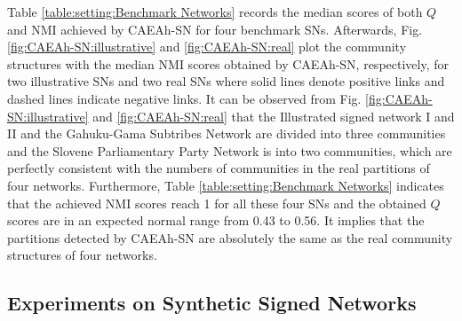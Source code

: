 \documentclass[10pt, journal]{IEEEtran}
\begin{document}
Table \ref{table:setting:Benchmark Networks} records the median scores of both $Q$ and NMI achieved by CAEAh-SN for four benchmark SNs.
Afterwards, Fig. \ref{fig:CAEAh-SN:illustrative} and \ref{fig:CAEAh-SN:real} plot the community structures with the median NMI scores obtained by CAEAh-SN, respectively, for two illustrative SNs and two real SNs where solid lines denote positive links and dashed lines indicate negative links.
It can be observed from Fig. \ref{fig:CAEAh-SN:illustrative} and \ref{fig:CAEAh-SN:real} that the Illustrated signed network I and II and the Gahuku-Gama Subtribes Network are divided into three communities and the Slovene Parliamentary Party Network is into two communities, which are perfectly consistent with the numbers of communities in the real partitions of four networks.
Furthermore, Table \ref{table:setting:Benchmark Networks} indicates that the achieved NMI scores reach 1 for all these four SNs and the obtained $Q$ scores are in an expected normal range from 0.43 to 0.56. It implies that the partitions detected by CAEAh-SN are absolutely the same as the real community structures of four networks.



\subsection{Experiments on Synthetic Signed Networks}\label{section:experiment:synthetic}
\end{document}
